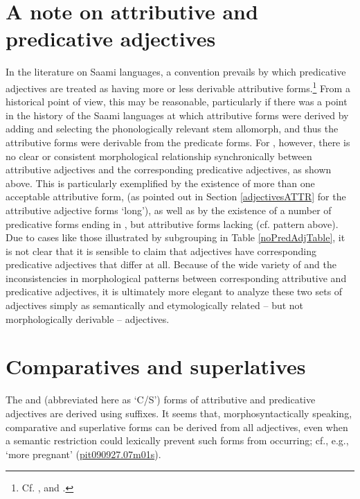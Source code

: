 \section{A note on attributive and predicative adjectives}\label{notePredNounsAdjs}
In the literature on Saami languages, a convention prevails by which predicative adjectives are treated as having more or less derivable attributive forms.\footnote{Cf. \citet[71]{Sammallahti1998}, \citet[74-76;98]{Svonni2009} and \citet[179]{Feist2010}.} 
From a historical point of view, this may be reasonable, particularly if there was a point in the history of the Saami languages at which attributive forms were derived by adding \mbox{} and selecting the phonologically relevant stem allomorph, and thus the attributive forms were derivable from the predicate forms. For \PS, however, there is no clear or consistent morphological relationship synchronically between attributive adjectives and the corresponding predicative adjectives, as shown above. This is particularly exemplified by the existence of more than one acceptable attributive form, (as pointed out in Section \ref{adjectivesATTR} for the attributive adjective forms \TILDE{} ‘long’), as well as by the existence of a number of predicative forms ending in , but attributive forms lacking  (cf. pattern  above). 
Due to cases like those illustrated by subgrouping  in Table \ref{noPredAdjTable}, it is not clear that it is sensible to claim that  adjectives have corresponding predicative adjectives that differ at all. 
Because of the wide variety of and the inconsistencies in morphological patterns between corresponding attributive and predicative adjectives, it is ultimately more elegant to analyze these two sets of adjectives simply as semantically and etymologically related – but not morphologically derivable – adjectives. 


\section{Comparatives and superlatives}\label{compSuperlADJs}
The  and  (abbreviated here as ‘C/S’) forms of attributive and predicative adjectives are derived using suffixes. It seems that, morphosyntactically speaking, comparative and superlative forms can be derived from all adjectives, even when a semantic restriction could lexically prevent such forms from occurring; cf., e.g.,  ‘more pregnant’ (\hyperlink{pit090927}{pit090927.07m01s}). 

